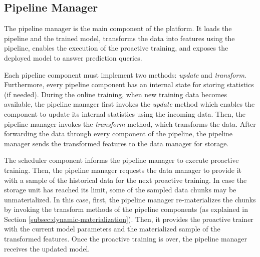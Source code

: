 

\subsection{Pipeline Manager} \label{pipeline-manager} 
The pipeline manager is the main component of the platform.
It loads the pipeline and the trained model, transforms the data into features using the pipeline, enables the execution of the proactive training, and exposes the deployed model to answer prediction queries.

Each pipeline component must implement two methods: \textit{update} and \textit{transform}.
Furthermore, every pipeline component has an internal state for storing statistics (if needed).
During the online training, when new training data becomes available, the pipeline manager first invokes the \textit{update} method which enables the component to update its internal statistics using the incoming data.
Then, the pipeline manager invokes the \textit{transform} method, which transforms the data.
After forwarding the data through every component of the pipeline, the pipeline manager sends the transformed features to the data manager for storage.

The scheduler component informs the pipeline manager to execute proactive training.
Then, the pipeline manager requests the data manager to provide it with a sample of the historical data for the next proactive training.
In case the storage unit has reached its limit, some of the sampled data chunks may be unmaterialized.
In this case, first, the pipeline manager re-materializes the chunks by invoking the transform methods of the pipeline components (as explained in Section \ref{subsec:dynamic-materialization}).
Then, it provides the proactive trainer with the current model parameters and the materialized sample of the transformed features.
Once the proactive training is over, the pipeline manager receives the updated model.

